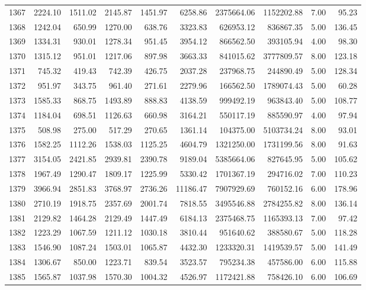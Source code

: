 \begin{tabular}{lrrrrrrrrr}
1367 & 2224.10 & 1511.02 & 2145.87 & 1451.97 & 6258.86 & 2375664.06 & 1152202.88 & 7.00 & 95.23 \\
1368 & 1242.04 & 650.99 & 1270.00 & 638.76 & 3323.83 & 626953.12 & 836867.35 & 5.00 & 136.45 \\
1369 & 1334.31 & 930.01 & 1278.34 & 951.45 & 3954.12 & 866562.50 & 393105.94 & 4.00 & 98.30 \\
1370 & 1315.12 & 951.01 & 1217.06 & 897.98 & 3663.33 & 841015.62 & 3777809.57 & 8.00 & 123.18 \\
1371 & 745.32 & 419.43 & 742.39 & 426.75 & 2037.28 & 237968.75 & 244890.49 & 5.00 & 128.34 \\
1372 & 951.97 & 343.75 & 961.40 & 271.61 & 2279.96 & 166562.50 & 1789074.43 & 5.00 & 60.28 \\
1373 & 1585.33 & 868.75 & 1493.89 & 888.83 & 4138.59 & 999492.19 & 963843.40 & 5.00 & 108.77 \\
1374 & 1184.04 & 698.51 & 1126.63 & 660.98 & 3164.21 & 550117.19 & 885590.97 & 4.00 & 97.94 \\
1375 & 508.98 & 275.00 & 517.29 & 270.65 & 1361.14 & 104375.00 & 5103734.24 & 8.00 & 93.01 \\
1376 & 1582.25 & 1112.26 & 1538.03 & 1125.25 & 4604.79 & 1321250.00 & 1731199.56 & 8.00 & 91.63 \\
1377 & 3154.05 & 2421.85 & 2939.81 & 2390.78 & 9189.04 & 5385664.06 & 827645.95 & 5.00 & 105.62 \\
1378 & 1967.49 & 1290.47 & 1809.17 & 1225.99 & 5330.42 & 1701367.19 & 294716.02 & 7.00 & 110.23 \\
1379 & 3966.94 & 2851.83 & 3768.97 & 2736.26 & 11186.47 & 7907929.69 & 760152.16 & 6.00 & 178.96 \\
1380 & 2710.19 & 1918.75 & 2357.69 & 2001.74 & 7818.55 & 3495546.88 & 2784255.82 & 8.00 & 136.14 \\
1381 & 2129.82 & 1464.28 & 2129.49 & 1447.49 & 6184.13 & 2375468.75 & 1165393.13 & 7.00 & 97.42 \\
1382 & 1223.29 & 1067.59 & 1211.12 & 1030.18 & 3810.44 & 951640.62 & 388580.67 & 5.00 & 118.28 \\
1383 & 1546.90 & 1087.24 & 1503.01 & 1065.87 & 4432.30 & 1233320.31 & 1419539.57 & 5.00 & 141.49 \\
1384 & 1306.67 & 850.00 & 1223.71 & 839.54 & 3523.57 & 795234.38 & 457586.00 & 6.00 & 115.88 \\
1385 & 1565.87 & 1037.98 & 1570.30 & 1004.32 & 4526.97 & 1172421.88 & 758426.10 & 6.00 & 106.69 \\

\end{tabular}
